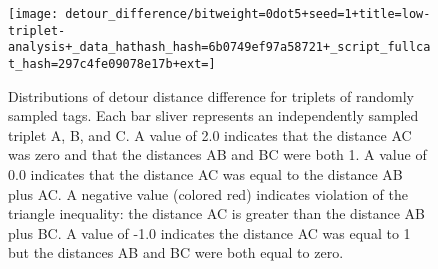 \begin{figure}
\begin{center}

\texttt{[image: detour\_difference/bitweight=0dot5+seed=1+title=low-triplet-analysis+\_data\_hathash\_hash=6b0749ef97a58721+\_script\_fullcat\_hash=297c4fe09078e17b+ext=]}
\caption{
Distributions of detour distance difference for triplets of randomly sampled tags.
Each bar sliver represents an independently sampled triplet A, B, and C.
A value of 2.0 indicates that the distance AC was zero and that the distances AB and BC were both 1.
A value of 0.0 indicates that the distance AC was equal to the distance AB plus AC.
A negative value (colored red) indicates violation of the triangle inequality: the distance AC is greater than the distance AB plus BC.
A value of -1.0 indicates the distance AC was equal to 1 but the distances AB and BC were both equal to zero.
}
\label{fig:detour_difference}

\end{center}
\end{figure}

